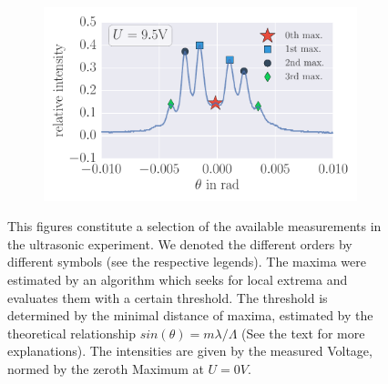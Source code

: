 \begin{figure}[H]
\begin{subfigure}[b]{\picwidth}
        \caption{}
        \label{fig:raman_014}
    \end{subfigure}
    \begin{subfigure}[b]{\picwidth}
        \includegraphics[width=1.0\textwidth]{analysis/figures/raman_020}
        \caption{}
        \label{fig:raman_020}
    \end{subfigure}
    \caption{This figures constitute a selection of the available measurements in the ultrasonic experiment. We denoted the 
    different orders by different symbols (see the respective legends). The maxima were estimated by an algorithm which seeks for local extrema
    and evaluates them with a certain threshold. The threshold is determined by the minimal distance of maxima, estimated by the theoretical 
    relationship $sin(\theta) = m \lambda / \Lambda$ (See the text for more explanations). The intensities are given by the measured Voltage,
    normed by the zeroth Maximum at $U=0V$.}\label{fig:raman}
\end{figure}
\newpage
